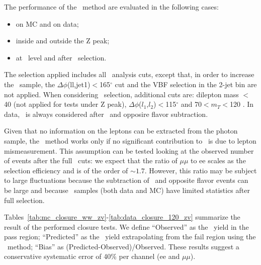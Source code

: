 The performance of the \zm\ method are evaluated in the following cases:
\begin{itemize}
\item on MC and on data;
\item inside and outside the Z peak;
\item at \WW\ level and after  \GeVcc\ selection.
\end{itemize}

The selection applied includes all \hww\ analysis cuts, except that, in order to increase the \dyll\ sample, 
the $\Delta\phi$(ll,jet1)$<$165$^\circ$ cut and the VBF selection in the 2-jet bin are not applied.
When considering   \GeVcc\ selection, additional cuts are: dilepton mass $<$40 \GeVcc (not applied for tests under Z peak), 
$\Delta\phi$($l_1$,$l_2$)$<$115$^\circ$ and 70$<$$m_T$$<$120 \GeVcc.
In data, \dyll\ is always considered after \V\Z\ and opposire flavor subtraction.

Given that no information on the leptons can be extracted from the photon sample, the \zm\ method works only if no significant contribution to \met\ is 
due to lepton mismeasurement. 
This assumption can be tested looking at the observed number of events after the full \met\ cuts: 
we expect that the ratio of $\mu\mu$ to ee scales as the selection efficiency and is of the order of $\sim 1.7$.
However, this ratio may be subject to large fluctuations because the subtraction of \V\Z\ and opposite flavor events 
can be large and because \dyll\ samples (both data and MC) have limited statistics after full selection.

Tables~\ref{tab:mc_closure_ww_zv}-\ref{tab:data_closure_120_zv} summarize the result of the performed closure tests.
We define ``Observed'' as the \dyll\ yield in the pass region; ``Predicted'' as the \dyll\ yield extrapolating from the fail region using the \zm\ method;
``Bias'' as (Predicted-Observed)/Observed.
These results suggest a conservative systematic error of 40\% per channel (ee and $\mu\mu$).

